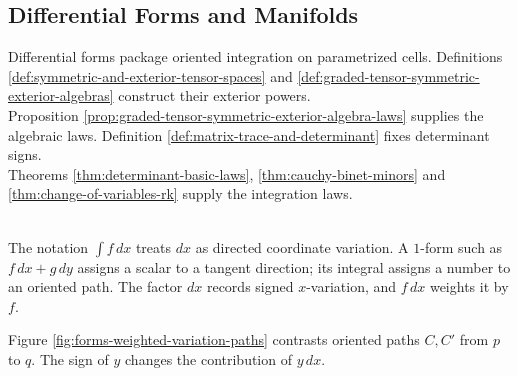 \subsection{Differential Forms and Manifolds}

Differential forms package oriented integration on parametrized cells. Definitions \ref{def:symmetric-and-exterior-tensor-spaces} and \ref{def:graded-tensor-symmetric-exterior-algebras} construct their exterior powers.\\
Proposition \ref{prop:graded-tensor-symmetric-exterior-algebra-laws} supplies the algebraic laws. Definition \ref{def:matrix-trace-and-determinant} fixes determinant signs.\\
Theorems \ref{thm:determinant-basic-laws}, \ref{thm:cauchy-binet-minors} and \ref{thm:change-of-variables-rk} supply the integration laws.

\begin{perspective} \label{per:differential-forms-as-functionals} \\
The notation $\int f\,dx$ treats $dx$ as directed coordinate variation. A $1$-form such as $f\,dx+g\,dy$ assigns a scalar to a tangent direction; its integral assigns a number to an oriented path. The factor $dx$ records signed $x$-variation, and $f\,dx$ weights it by $f$.
\end{perspective}

Figure \ref{fig:forms-weighted-variation-paths} contrasts oriented paths $C,C'$ from $p$ to $q$. The sign of $y$ changes the contribution of $y\,dx$.

\begin{illustrationfigure}[H]
  \centering
  
  \caption{$y\,dx$ records signed, $y$-weighted $x$-variation.}
  \label{fig:forms-weighted-variation-paths}
\end{illustrationfigure}

